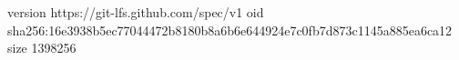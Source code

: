 version https://git-lfs.github.com/spec/v1
oid sha256:16e3938b5ec77044472b8180b8a6b6e644924e7c0fb7d873c1145a885ea6ca12
size 1398256
